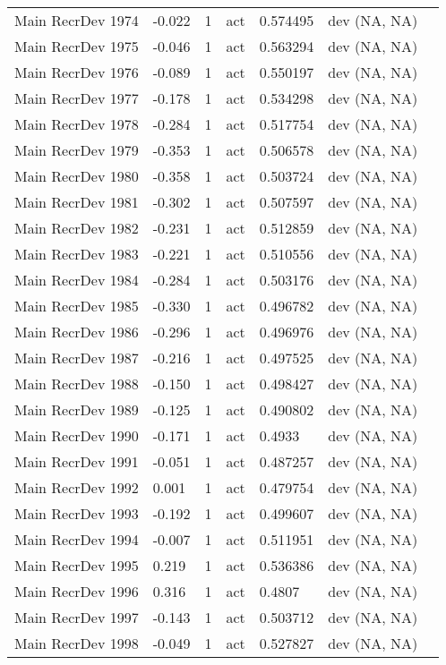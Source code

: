 \documentclass[11pt,
  english,
  a4paper,
]{article}
\begin{document}
\begin{landscape}
\begin{longtable}[t]{>{\raggedright\arraybackslash}p{6cm}lllll>{\raggedright\arraybackslash}p{4cm}}
Main RecrDev 1974 & -0.022 & 1 & act & 0.574495 & dev (NA, NA)\\
Main RecrDev 1975 & -0.046 & 1 & act & 0.563294 & dev (NA, NA)\\
Main RecrDev 1976 & -0.089 & 1 & act & 0.550197 & dev (NA, NA)\\
Main RecrDev 1977 & -0.178 & 1 & act & 0.534298 & dev (NA, NA)\\
Main RecrDev 1978 & -0.284 & 1 & act & 0.517754 & dev (NA, NA)\\
Main RecrDev 1979 & -0.353 & 1 & act & 0.506578 & dev (NA, NA)\\
Main RecrDev 1980 & -0.358 & 1 & act & 0.503724 & dev (NA, NA)\\
Main RecrDev 1981 & -0.302 & 1 & act & 0.507597 & dev (NA, NA)\\
Main RecrDev 1982 & -0.231 & 1 & act & 0.512859 & dev (NA, NA)\\
Main RecrDev 1983 & -0.221 & 1 & act & 0.510556 & dev (NA, NA)\\
Main RecrDev 1984 & -0.284 & 1 & act & 0.503176 & dev (NA, NA)\\
Main RecrDev 1985 & -0.330 & 1 & act & 0.496782 & dev (NA, NA)\\
Main RecrDev 1986 & -0.296 & 1 & act & 0.496976 & dev (NA, NA)\\
Main RecrDev 1987 & -0.216 & 1 & act & 0.497525 & dev (NA, NA)\\
Main RecrDev 1988 & -0.150 & 1 & act & 0.498427 & dev (NA, NA)\\
Main RecrDev 1989 & -0.125 & 1 & act & 0.490802 & dev (NA, NA)\\
Main RecrDev 1990 & -0.171 & 1 & act & 0.4933 & dev (NA, NA)\\
Main RecrDev 1991 & -0.051 & 1 & act & 0.487257 & dev (NA, NA)\\
Main RecrDev 1992 & 0.001 & 1 & act & 0.479754 & dev (NA, NA)\\
Main RecrDev 1993 & -0.192 & 1 & act & 0.499607 & dev (NA, NA)\\
Main RecrDev 1994 & -0.007 & 1 & act & 0.511951 & dev (NA, NA)\\
Main RecrDev 1995 & 0.219 & 1 & act & 0.536386 & dev (NA, NA)\\
Main RecrDev 1996 & 0.316 & 1 & act & 0.4807 & dev (NA, NA)\\
Main RecrDev 1997 & -0.143 & 1 & act & 0.503712 & dev (NA, NA)\\
Main RecrDev 1998 & -0.049 & 1 & act & 0.527827 & dev (NA, NA)\\

\end{longtable}
\end{landscape}
\end{document}
